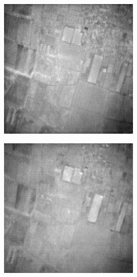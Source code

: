\begin{figure}
\begin{subfigure}[b]{0.19\textwidth}
    \end{subfigure}
    \hfill
    \begin{subfigure}[b]{0.19\textwidth}
        \centering
        \includegraphics[width=\textwidth]{../figs/outputs/cut/24.png}
    \end{subfigure}
    \hfill
    \begin{subfigure}[b]{0.19\textwidth}
        \centering
        \includegraphics[width=\textwidth]{../figs/outputs/petit/24.png}

\end{subfigure}
\end{figure}
